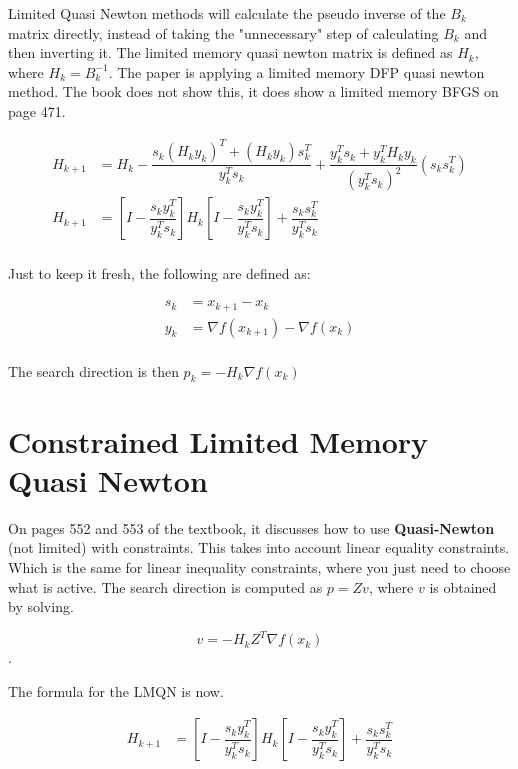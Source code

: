 \documentclass{article}
\begin{document}
Limited Quasi Newton methods will calculate the pseudo inverse of the $B_{k}$ matrix directly, instead of taking the "unnecessary" step of calculating $B_{k}$ and then inverting it. The limited memory quasi newton matrix is defined as $H_{k}$, where $H_{k} = B_{k}^{-1}$. The paper is applying a limited memory DFP quasi newton method. The book does not show this, it does show a limited memory BFGS on page 471.

\begin{equation*}
\begin{aligned}
        H_{k+1} & = H_{k} -\dfrac{s_{k}(H_{k}y_{k})^{T} + (H_{k}y_{k})s_{k}^{T}}{y_{k}^{T}s_{k}} + \dfrac{y_{k}^{T}s_{k}+y_{k}^{T}H_{k}y_{k}}{(y_{k}^{T}s_{k})^2}(s_{k}s_{k}^{T})\\
        H_{k+1} & = \left [ I - \dfrac{s_{k}y_{k}^{T}}{y_{k}^{T}s_{k}} \right ] H_{k} \left [ I - \dfrac{s_{k}y_{k}^{T}}{y_{k}^{T}s_{k}} \right ] + \dfrac{s_{k}s_{k}^{T}}{y_{k}^{T}s_{k}} \\
\end{aligned}
\end{equation*}

Just to keep it fresh, the following are defined as:

\begin{equation*}
\begin{aligned}
        s_{k} & = x_{k+1} - x_{k} \\
        y_{k} & = \nabla f(x_{k+1}) - \nabla f(x_{k}) \\
\end{aligned}
\end{equation*}

The search direction is then $p_{k} = -H_k \nabla f(x_k)$

\section{Constrained Limited Memory Quasi Newton}

On pages 552 and 553 of the textbook, it discusses how to use \textbf{Quasi-Newton} (not limited) with constraints. This takes into account linear equality constraints. Which is the same for linear inequality constraints, where you just need to choose what is active. The search direction is computed as $p = Zv$, where $v$ is obtained by solving.

$$v = -H_{k} Z^{T} \nabla f (x_{k})$$.

The formula for the LMQN is now.

\begin{equation*}
\begin{aligned}
        H_{k+1} & = \left [ I - \dfrac{s_{k}y_{k}^{T}}{y_{k}^{T}s_{k}} \right ] H_{k} \left [ I - \dfrac{s_{k}y_{k}^{T}}{y_{k}^{T}s_{k}} \right ] + \dfrac{s_{k}s_{k}^{T}}{y_{k}^{T}s_{k}} \\
\end{aligned}
\end{equation*}
\end{document}
